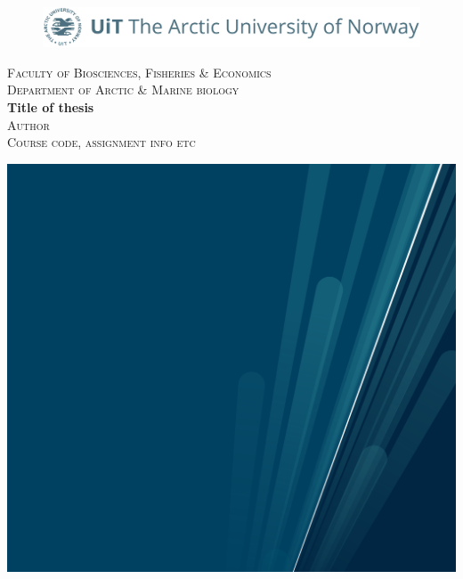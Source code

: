 \documentclass[twoside, 12pt]{article} %
\begin{document}
\begin{titlepage} %

\newcommand{\HRule}{\rule{\linewidth}{0.5mm}} %

\begin{figure}
	\vspace{-0pt}
	\hspace{-50pt}
\includegraphics[width=0.8\linewidth]{Graphix/UiT_logo} %
\end{figure}

\vspace{-.5cm}
		\noindent\textsc{Faculty of Biosciences, Fisheries \& Economics}\\[0.0cm]
		\noindent\textsc{Department of Arctic \& Marine biology}\\[.5cm] 

		{\noindent \large \bfseries Title of thesis }\\[0.4cm] %
		\textsc{Author}\\
		\textsc{Course code, assignment info etc}
		\vspace{1cm}

\begin{centering}
	\hspace{-2.6cm} %
	\vspace{0.5cm}
	\includegraphics[width=1.330\linewidth]{Graphix/Front_graphic} %
\end{centering}



\end{titlepage}
\end{document}
